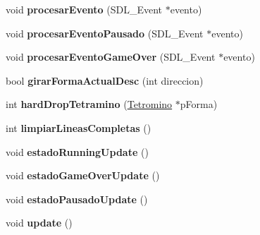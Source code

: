\begin{DoxyCompactItemize}
\item 
void {\bfseries procesar\+Evento} (S\+D\+L\+\_\+\+Event $\ast$evento)\hypertarget{class_tetris_juego_a8858efbfc48aa2ad2a997fda38931537}{}\label{class_tetris_juego_a8858efbfc48aa2ad2a997fda38931537}

\item 
void {\bfseries procesar\+Evento\+Pausado} (S\+D\+L\+\_\+\+Event $\ast$evento)\hypertarget{class_tetris_juego_a3eaa02c248a85e9ce45d3f9b905c640f}{}\label{class_tetris_juego_a3eaa02c248a85e9ce45d3f9b905c640f}

\item 
void {\bfseries procesar\+Evento\+Game\+Over} (S\+D\+L\+\_\+\+Event $\ast$evento)\hypertarget{class_tetris_juego_a864c67b2815edf2f9cb0a0d4a086c3a0}{}\label{class_tetris_juego_a864c67b2815edf2f9cb0a0d4a086c3a0}

\item 
bool {\bfseries girar\+Forma\+Actual\+Desc} (int direccion)\hypertarget{class_tetris_juego_a6fa81d87f7ac024fc38427e48a78521f}{}\label{class_tetris_juego_a6fa81d87f7ac024fc38427e48a78521f}

\item 
int {\bfseries hard\+Drop\+Tetramino} (\hyperlink{class_tetromino}{Tetromino} $\ast$p\+Forma)\hypertarget{class_tetris_juego_a202f50e6a0b964c1f254b67c9da2d3c8}{}\label{class_tetris_juego_a202f50e6a0b964c1f254b67c9da2d3c8}

\item 
int {\bfseries limpiar\+Lineas\+Completas} ()\hypertarget{class_tetris_juego_a9addc531dabf47f16038ccaf89fcc573}{}\label{class_tetris_juego_a9addc531dabf47f16038ccaf89fcc573}

\item 
void {\bfseries estado\+Running\+Update} ()\hypertarget{class_tetris_juego_a7932a0b42bf193746243ec4a1b3c480f}{}\label{class_tetris_juego_a7932a0b42bf193746243ec4a1b3c480f}

\item 
void {\bfseries estado\+Game\+Over\+Update} ()\hypertarget{class_tetris_juego_a03a673614edae7c5bd19990abe280ee7}{}\label{class_tetris_juego_a03a673614edae7c5bd19990abe280ee7}

\item 
void {\bfseries estado\+Pausado\+Update} ()\hypertarget{class_tetris_juego_ae36884d298b8d1725b646f2727aa5560}{}\label{class_tetris_juego_ae36884d298b8d1725b646f2727aa5560}

\item 
void {\bfseries update} ()\hypertarget{class_tetris_juego_aff6ae06668265e804b765d024e0c07fb}{}\label{class_tetris_juego_aff6ae06668265e804b765d024e0c07fb}


\end{DoxyCompactItemize}
